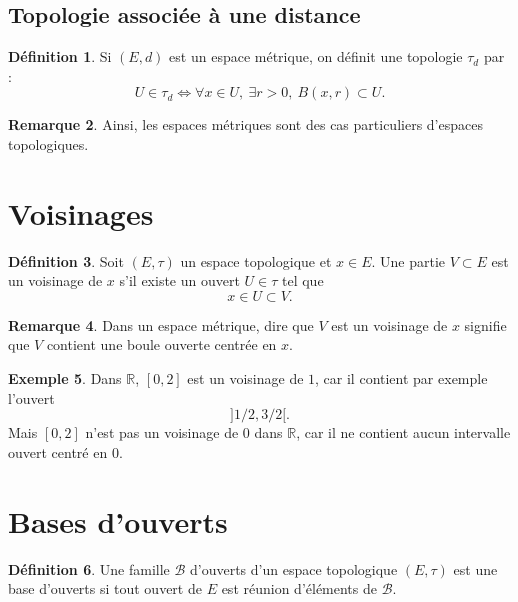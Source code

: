 \documentclass[11pt,a4paper]{article}
\theoremstyle{definition}
\newtheorem{definition}{Définition}[section]
\newtheorem{exemple}[definition]{Exemple}
\newtheorem{remarque}[definition]{Remarque}
\theoremstyle{plain}
\newcommand{\R}{\mathbb{R}}
\begin{document}
\subsection{Topologie associée à une distance}

\begin{definition}
Si $(E,d)$ est un espace métrique, on définit une topologie $\tau_d$ par :
\[
U\in\tau_d
\Longleftrightarrow
\forall x\in U,\ \exists r>0,\ B(x,r)\subset U.
\]
\end{definition}

\begin{remarque}
Ainsi, les espaces métriques sont des cas particuliers d'espaces topologiques.
\end{remarque}

\section{Voisinages}

\begin{definition}
Soit $(E,\tau)$ un espace topologique et $x\in E$.
Une partie $V\subset E$ est un voisinage de $x$ s'il existe un ouvert $U\in\tau$ tel que
\[
x\in U\subset V.
\]
\end{definition}

\begin{remarque}
Dans un espace métrique, dire que $V$ est un voisinage de $x$ signifie que $V$ contient une boule ouverte centrée en $x$.
\end{remarque}

\begin{exemple}
Dans $\R$, $[0,2]$ est un voisinage de $1$, car il contient par exemple l'ouvert
\[
]1/2,3/2[.
\]
Mais $[0,2]$ n'est pas un voisinage de $0$ dans $\R$, car il ne contient aucun intervalle ouvert centré en $0$.
\end{exemple}

\section{Bases d'ouverts}

\begin{definition}
Une famille $\mathcal B$ d'ouverts d'un espace topologique $(E,\tau)$ est une base d'ouverts si tout ouvert de $E$ est réunion d'éléments de $\mathcal B$.
\end{definition}
\end{document}

